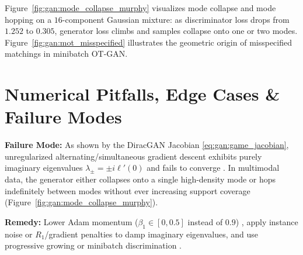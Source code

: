 \documentclass[../../../../master.tex]{subfiles}
\begin{document}
Figure~\ref{fig:gan:mode_collapse_murphy} visualizes mode collapse and mode hopping on a $16$-component Gaussian mixture: as discriminator loss drops from $1.252$ to $0.305$, generator loss climbs and samples collapse onto one or two modes. Figure~\ref{fig:gan:mot_misspecified} illustrates the geometric origin of misspecified matchings in minibatch OT-GAN.



\section{Numerical Pitfalls, Edge Cases \& Failure Modes}
\label{sec:gan:pitfalls}

\begin{pitfall}
\textbf{Failure Mode:} As shown by the DiracGAN Jacobian \eqref{eq:gan:game_jacobian}, unregularized alternating/simultaneous gradient descent exhibits purely imaginary eigenvalues $\lambda_\pm = \pm i\ell'(0)$ and fails to converge . In multimodal data, the generator either collapses onto a single high-density mode or hops indefinitely between modes without ever increasing support coverage (Figure~\ref{fig:gan:mode_collapse_murphy}).

\textbf{Remedy:} Lower Adam momentum ($\beta_1 \in [0, 0.5]$ instead of $0.9$) , apply instance noise or $R_1$/gradient penalties to damp imaginary eigenvalues, and use progressive growing or minibatch discrimination .
\end{pitfall}
\end{document}

